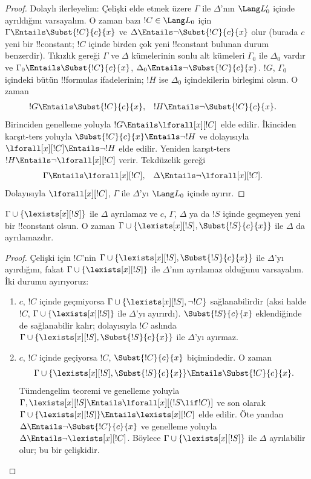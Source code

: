 \documentclass[../../../include/open-logic-section]{subfiles}
\begin{document}
\begin{proof}
Dolaylı ilerleyelim: Çelişki elde etmek üzere $\Gamma$ ile $\Delta$'nın
$\Lang L'_0$ içinde ayrıldığını varsayalım. O zaman bazı
$!C\in\Lang L_0$ için
$\Gamma\Entails\Subst{!C}{c}{x}$ ve
$\Delta\Entails\lnot\Subst{!C}{c}{x}$ olur (burada $c$ yeni bir
!!{constant}; $!C$ içinde birden çok yeni !!{constant} bulunan durum
benzerdir). Tıkızlık gereği $\Gamma$ ve $\Delta$ kümelerinin sonlu alt
kümeleri $\Gamma_0$ ile $\Delta_0$ vardır ve
$\Gamma_0\Entails\Subst{!C}{c}{x}$,
$\Delta_0\Entails\lnot\Subst{!C}{c}{x}$. $!G$, $\Gamma_0$ içindeki
bütün !!{formula}s ifadelerinin; $!H$ ise $\Delta_0$ içindekilerin
birleşimi olsun. O zaman
\begin{align*}
  !G & \Entails \Subst{!C}{c}{x}, &
  !H & \Entails \lnot \Subst{!C}{c}{x}.
\end{align*}
Birinciden genelleme yoluyla $!G\Entails\lforall[x][!C]$ elde edilir.
İkinciden karşıt-ters yoluyla
$\Subst{!C}{c}{x}\Entails\lnot !H$ ve dolayısıyla
$\lforall[x][!C]\Entails\lnot !H$ elde edilir. Yeniden karşıt-ters
$!H\Entails\lnot\lforall[x][!C]$ verir. Tekdüzelik gereği
\begin{align*}
  \Gamma &\Entails \lforall[x][!C], &
  \Delta &\Entails \lnot \lforall[x][!C].
\end{align*}
Dolayısıyla $\lforall[x][!C]$, $\Gamma$ ile $\Delta$'yı
$\Lang L_0$ içinde ayırır.
\end{proof}

\begin{lem}
$\Gamma\cup\{\lexists[x][!S]\}$ ile $\Delta$ ayrılamaz ve $c$,
$\Gamma$, $\Delta$ ya da $!S$ içinde geçmeyen yeni bir !!{constant}
olsun. O zaman
$\Gamma\cup\{\lexists[x][!S],\Subst{!S}{c}{x}\}$ ile $\Delta$ da
ayrılamazdır.
\end{lem}

\begin{proof}
Çelişki için $!C$'nin
$\Gamma\cup\{\lexists[x][!S],\Subst{!S}{c}{x}\}$ ile $\Delta$'yı
ayırdığını, fakat $\Gamma\cup\{\lexists[x][!S]\}$ ile $\Delta$'nın
ayrılamaz olduğunu varsayalım. İki durumu ayırıyoruz:
\begin{enumerate}
\item $c$, $!C$ içinde geçmiyorsa
  $\Gamma\cup\{\lexists[x][!S],\lnot !C\}$ sağlanabilirdir (aksi halde
  $!C$, $\Gamma\cup\{\lexists[x][!S]\}$ ile $\Delta$'yı ayırırdı).
  $\Subst{!S}{c}{x}$ eklendiğinde de sağlanabilir kalır; dolayısıyla
  $!C$ aslında
  $\Gamma\cup\{\lexists[x][!S],\Subst{!S}{c}{x}\}$ ile $\Delta$'yı
  ayırmaz.
\item $c$, $!C$ içinde geçiyorsa $!C$, $\Subst{!C}{c}{x}$ biçimindedir.
  O zaman
  \[
  \Gamma \cup \{ \lexists[x][!S], \Subst{!S}{c}{x}\}
  \Entails \Subst{!C}{c}{x}.
  \]
  Tümdengelim teoremi ve genelleme yoluyla
  $\Gamma,\lexists[x][!S]\Entails\lforall[x][(!S\lif !C)]$ ve son
  olarak
  $\Gamma\cup\{\lexists[x][!S]\}\Entails\lexists[x][!C]$ elde edilir.
  Öte yandan $\Delta\Entails\lnot\Subst{!C}{c}{x}$ ve genelleme
  yoluyla $\Delta\Entails\lnot\lexists[x][!C]$. Böylece
  $\Gamma\cup\{\lexists[x][!S]\}$ ile $\Delta$ ayrılabilir olur; bu
  bir çelişkidir.
\end{enumerate}
\end{proof}
\end{document}
